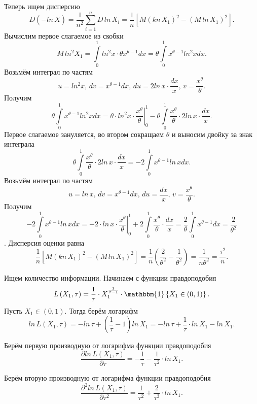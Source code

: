 Теперь ищем дисперсию
$$D \left( - \overline{ln \, X} \right) =
  \frac{1}{n^2} \sum \limits_{i = 1}^n D \, ln \, X_i =
  \frac{1}{n} \left[ M \left( kn \, X_1 \right)^2 - \left( M \, ln \, X_1 \right)^2 \right].$$
Вычислим первое слагаемое из скобки
$$M \, ln^2 X_1 =
  \int \limits_0^1 ln^2 x \cdot \theta x^{ \theta - 1} dx =
  \theta \int \limits_0^1 x^{ \theta - 1} ln^2 xdx.$$
Возьмём интеграл по частям
$$u = ln^2 x, \,
  dv = x^{ \theta - 1} dx, \,
  du = 2ln \, x \cdot \frac{dx}{x}, \,
  v = \frac{x^{ \theta }}{ \theta }.$$
Получим
$$ \theta \int \limits_0^1 x^{ \theta - 1} ln^2 xdx =
  \theta \cdot \left. ln^2 x \cdot \frac{x^{ \theta }}{ \theta } \right|_0^1 -
  \theta \int \limits_0^1 \frac{x^{ \theta }}{ \theta } \cdot 2ln \, x \cdot \frac{dx}{x}.$$
Первое слагаемое зануляется, во втором сокращаем $ \theta $ и выносим двойку за знак интеграла
$$ \theta \int \limits_0^1 \frac{x^{ \theta }}{ \theta } \cdot 2ln \, x \cdot \frac{dx}{x} =
  -2 \int \limits_0^1 x^{ \theta - 1} ln \, xdx.$$
Возьмём интеграл по частям
$$u = ln \, x, \,
  dv = x^{ \theta - 1} dx, \,
  du = \frac{dx}{x}, \,
  v = \frac{x^{ \theta }}{ \theta }.$$
Получим
$$-2 \int \limits_0^1 x^{ \theta - 1} ln \, xdx =
  -2 \cdot \left. ln \, x \cdot \frac{x^{ \theta }}{ \theta } \right|_0^1 +
  2 \int \limits_0^1 \frac{x^{ \theta }}{ \theta } \cdot \frac{dx}{x} =
  \frac{2}{ \theta } \int \limits_0^1 x^{ \theta - 1} dx =
  \frac{2}{ \theta^2}$$.
Дисперсия оценки равна
$$ \frac{1}{n} \left[ M \left( kn \, X_1 \right)^2 - \left( M \, ln \, X_1 \right)^2 \right] =
  \frac{1}{n} \left( \frac{2}{ \theta^2} - \frac{1}{ \theta^2} \right) =
  \frac{1}{n \theta^2} =
  \frac{ \tau^2}{n}.$$

Ищем количество информации. Начинаем с функции правдоподобия
$$L \left( X_1, \tau \right) =
  \frac{1}{ \tau } \cdot X_1^{ \frac{1}{ \tau - 1}} \cdot
  \mathbbm{1} \left\{ X_1 \in \left( 0, 1 \right) \right\}.$$
Пусть $X_1 \in \left( 0, 1 \right) $.
Тогда берём логарифм
$$ln \, L \left( X_1, \tau \right) =
  -ln \, \tau + \left( \frac{1}{ \tau } - 1 \right) ln \, X_1 =
  -ln \, \tau + \frac{1}{ \tau } \cdot ln \, X_1 - ln \, X_1.$$

Берём первую производную от логарифма функции правдоподобия
$$ \frac{ \partial ln \, L \left( X_1, \tau \right) }{ \partial \tau } =
  - \frac{1}{ \tau } - \frac{1}{ \tau^2} \cdot ln \, X_1.$$

Берём вторую производную от логарифма функции правдоподобия
$$ \frac{ \partial^2 ln \, L \left( X_1, \tau \right) }{ \partial \tau^2} =
  \frac{1}{ \tau^2} + \frac{2}{ \tau^3} \cdot ln \, X_1.$$

